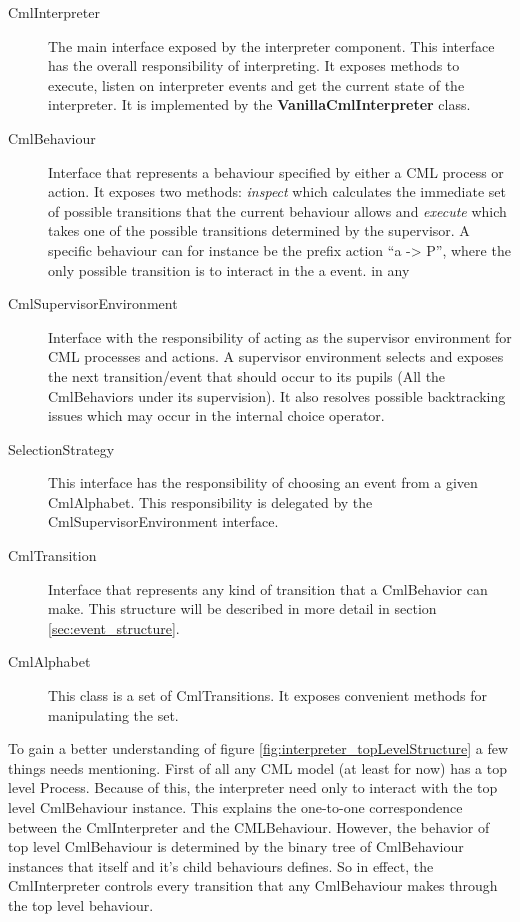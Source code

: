\documentclass[a4paper, 10pt]{include/compassreport}   %
\begin{document}
\begin{description}
\item[CmlInterpreter] The main interface exposed by
  the interpreter component. This interface has the overall
  responsibility of interpreting. It exposes methods to execute, listen
  on interpreter events and get the current state of the interpreter. It
  is implemented by the \textbf{VanillaCmlInterpreter} class.
\item[CmlBehaviour] Interface that represents a behaviour specified by
  either a CML process or action. It exposes two methods: \emph{inspect}
  which calculates the immediate set of possible transitions that the
  current behaviour allows and \emph{execute} which takes one of the
  possible transitions determined by the supervisor. A specific
  behaviour can for instance be the prefix action ``a -> P'', where the
  only possible transition is to interact in the a event.  in any
\item [CmlSupervisorEnvironment] Interface with the responsibility of
  acting as the supervisor environment for CML processes and actions. A
  supervisor environment selects and exposes the next transition/event
  that should occur to its pupils (All the CmlBehaviors under its
  supervision). It also resolves possible backtracking issues which
  may occur in the internal choice operator. 
\item[SelectionStrategy] This interface has the responsibility
  of choosing an event from a given CmlAlphabet. This responsibility is
  delegated by the CmlSupervisorEnvironment interface.
\item[CmlTransition] Interface that represents any kind of transition that
  a CmlBehavior can make. This structure will be described in more
  detail in section \ref{sec:event_structure}.
\item[CmlAlphabet] This class is a set of CmlTransitions. It exposes
  convenient methods for manipulating the set.
\end{description}

To gain a better understanding of figure
\ref{fig:interpreter_topLevelStructure} a few things needs
mentioning. First of all any CML model (at least for now) has a top
level Process. Because of this, the interpreter need only to interact
with the top level CmlBehaviour instance. This explains the one-to-one
correspondence between the CmlInterpreter and the
CMLBehaviour. However, the behavior of top level CmlBehaviour is
determined by the binary tree of CmlBehaviour instances that itself
and it's child behaviours defines. So in effect, the CmlInterpreter
controls every transition that any CmlBehaviour makes through the top
level behaviour.
\end{document}
